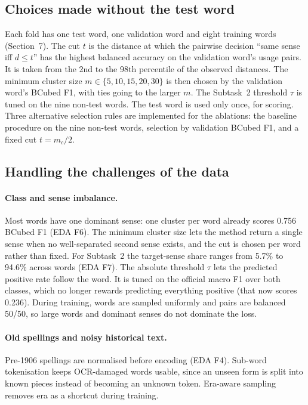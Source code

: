 \subsection{Choices made without the test word}
\label{sec:approach-selection}

Each fold has one test word, one validation word and eight training words
(Section~7). The cut $t$ is the distance at which the pairwise decision
``same sense iff $d\le t$'' has the highest balanced accuracy on the validation
word's usage pairs. It is taken from the 2nd to the 98th percentile of the
observed distances. The minimum cluster size $m\in\{5,10,15,20,30\}$ is then
chosen by the validation word's BCubed F1, with ties going to the larger $m$.
The Subtask~2 threshold $\tau$ is tuned on the nine non-test words. The test word
is used only once, for scoring. Three alternative selection rules are
implemented for the ablations: the baseline procedure on the nine non-test words,
selection by validation BCubed F1, and a fixed cut $t=m_c/2$.

\subsection{Handling the challenges of the data}
\label{sec:approach-challenges}

\paragraph{Class and sense imbalance.} Most words have one dominant sense: one
cluster per word already scores 0.756 BCubed F1 (EDA F6). The minimum cluster
size lets the method return a single sense when no well-separated second sense
exists, and the cut is chosen per word rather than fixed. For Subtask~2 the
target-sense share ranges from 5.7\% to 94.6\% across words (EDA F7). The absolute
threshold $\tau$ lets the predicted positive rate follow the word. It is tuned on
the official macro F1 over both classes, which no longer rewards predicting
everything positive (that now scores 0.236). During training, words are sampled
uniformly and pairs are balanced 50/50, so large words and dominant senses do
not dominate the loss.

\paragraph{Old spellings and noisy historical text.} Pre-1906 spellings are
normalised before encoding (EDA F4). Sub-word tokenisation keeps OCR-damaged
words usable, since an unseen form is split into known pieces instead of becoming
an unknown token. Era-aware sampling removes era as a shortcut during training.

